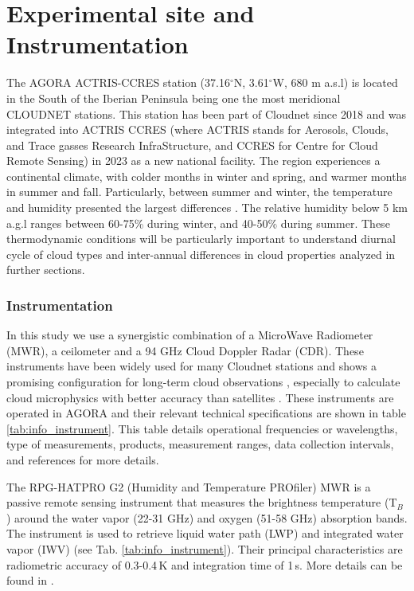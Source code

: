 \section{Experimental site and Instrumentation}\label{sec:site_instruments_products}

The AGORA ACTRIS-CCRES station (37.16$^{\circ}$N, 3.61$^{\circ}$W, 680 m a.s.l) is located in the South of the Iberian Peninsula being one the most meridional CLOUDNET stations. This station has been part of Cloudnet since 2018 and was integrated into ACTRIS CCRES (where ACTRIS stands for Aerosols, Clouds, and Trace gasses Research InfraStructure, and CCRES for Centre for Cloud Remote Sensing) in 2023 as a new national facility. The region experiences a continental climate, with colder months in winter and spring, and warmer months in summer and fall. Particularly, between summer and winter, the temperature and humidity presented the largest differences \citep{bedoya-velasquezSeasonalAnalysisAtmosphere2019}.
The relative humidity below 5 km a.g.l ranges between 60-75\% during winter, and 40-50\% during summer. 
These thermodynamic conditions will be particularly important to understand diurnal cycle of cloud types and inter-annual differences in cloud properties analyzed in further sections.

\subsubsection{Instrumentation}

In this study we use a synergistic combination of a MicroWave Radiometer (MWR), a ceilometer and a 94 GHz Cloud Doppler Radar (CDR). These instruments have been widely used for many Cloudnet stations and shows a promising configuration for long-term cloud observations \citep{illingworthCloudnet2007}, especially to calculate cloud microphysics with better accuracy than satellites \citep{protatAssessmentCloudsatReflectivity2009}. These instruments are operated in AGORA and their relevant technical specifications are shown in table \ref{tab:info_instrument}. This table details operational frequencies or wavelengths, type of measurements, products, measurement ranges, data collection intervals, and references for more details.

The RPG-HATPRO G2 (Humidity and Temperature PROfiler) MWR is a passive remote sensing instrument that measures the brightness temperature (T$_{B}$) around the water vapor (22-31 GHz) and oxygen (51-58 GHz) absorption bands. The instrument is used to retrieve liquid water path (LWP) and integrated water vapor (IWV) (see Tab. \ref{tab:info_instrument}). Their principal characteristics are radiometric accuracy of 0.3-0.4\,K and integration time of 1\,s. More details can be found in \cite{navas-guzmanTroposphericWaterVapour2014a, roseNetworkSuitableMicrowave2005}.

